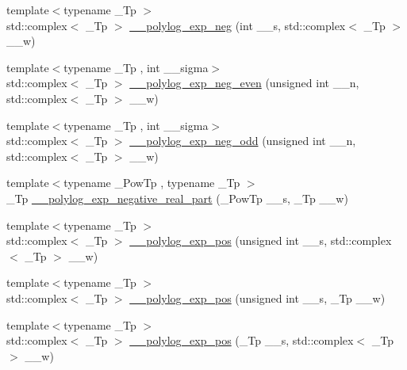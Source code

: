 \begin{DoxyCompactItemize}
\item 
{\footnotesize template$<$typename \+\_\+\+Tp $>$ }\\std\+::complex$<$ \+\_\+\+Tp $>$ \hyperlink{namespacestd_1_1____detail_aac54584aa89fef6a08a258ad6e2a75f5}{\+\_\+\+\_\+polylog\+\_\+exp\+\_\+neg} (int \+\_\+\+\_\+s, std\+::complex$<$ \+\_\+\+Tp $>$ \+\_\+\+\_\+w)
\item 
{\footnotesize template$<$typename \+\_\+\+Tp , int \+\_\+\+\_\+sigma$>$ }\\std\+::complex$<$ \+\_\+\+Tp $>$ \hyperlink{namespacestd_1_1____detail_affdff8c867d264b62a64427e53f5b9aa}{\+\_\+\+\_\+polylog\+\_\+exp\+\_\+neg\+\_\+even} (unsigned int \+\_\+\+\_\+n, std\+::complex$<$ \+\_\+\+Tp $>$ \+\_\+\+\_\+w)
\item 
{\footnotesize template$<$typename \+\_\+\+Tp , int \+\_\+\+\_\+sigma$>$ }\\std\+::complex$<$ \+\_\+\+Tp $>$ \hyperlink{namespacestd_1_1____detail_a114ec67e6802a402064b16a9a77f0863}{\+\_\+\+\_\+polylog\+\_\+exp\+\_\+neg\+\_\+odd} (unsigned int \+\_\+\+\_\+n, std\+::complex$<$ \+\_\+\+Tp $>$ \+\_\+\+\_\+w)
\item 
{\footnotesize template$<$typename \+\_\+\+Pow\+Tp , typename \+\_\+\+Tp $>$ }\\\+\_\+\+Tp \hyperlink{namespacestd_1_1____detail_a466240361bcf30941d84a8fc3cd91cf9}{\+\_\+\+\_\+polylog\+\_\+exp\+\_\+negative\+\_\+real\+\_\+part} (\+\_\+\+Pow\+Tp \+\_\+\+\_\+s, \+\_\+\+Tp \+\_\+\+\_\+w)
\item 
{\footnotesize template$<$typename \+\_\+\+Tp $>$ }\\std\+::complex$<$ \+\_\+\+Tp $>$ \hyperlink{namespacestd_1_1____detail_a0327d2970eba3a0a2d73c71c7a77701c}{\+\_\+\+\_\+polylog\+\_\+exp\+\_\+pos} (unsigned int \+\_\+\+\_\+s, std\+::complex$<$ \+\_\+\+Tp $>$ \+\_\+\+\_\+w)
\item 
{\footnotesize template$<$typename \+\_\+\+Tp $>$ }\\std\+::complex$<$ \+\_\+\+Tp $>$ \hyperlink{namespacestd_1_1____detail_ab13a4be6685dd222b654da3297342d7e}{\+\_\+\+\_\+polylog\+\_\+exp\+\_\+pos} (unsigned int \+\_\+\+\_\+s, \+\_\+\+Tp \+\_\+\+\_\+w)
\item 
{\footnotesize template$<$typename \+\_\+\+Tp $>$ }\\std\+::complex$<$ \+\_\+\+Tp $>$ \hyperlink{namespacestd_1_1____detail_a56b0f5bc6f4955469fd5f83105cbd466}{\+\_\+\+\_\+polylog\+\_\+exp\+\_\+pos} (\+\_\+\+Tp \+\_\+\+\_\+s, std\+::complex$<$ \+\_\+\+Tp $>$ \+\_\+\+\_\+w)
\item 

\end{DoxyCompactItemize}
